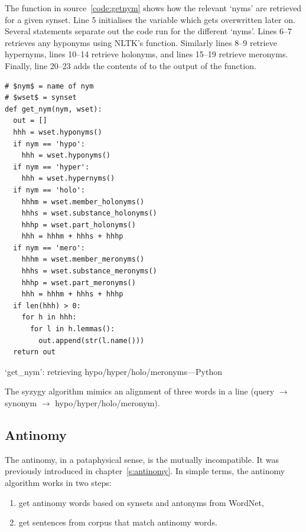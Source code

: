 The  function in source~\ref{code:getnym} shows how the relevant `nyms' are retrieved for a given synset. Line 5 initialises the variable  which gets overwritten later on. Several  statements separate out the code run for the different `nyms'. Lines 6--7 retrieves any hyponyms using \ac{NLTK}'s  function. Similarly lines 8--9 retrieve hypernyms, lines 10--14 retrieve holonyms, and lines 15--19 retrieve meronyms. Finally, line 20--23 adds the contents of  to the output of the function.

\begin{listing}[!htbp] %
  \begin{verbatim}
# $nym$ = name of nym
# $wset$ = synset
def get_nym(nym, wset):
  out = []
  hhh = wset.hyponyms()
  if nym == 'hypo':
    hhh = wset.hyponyms()
  if nym == 'hyper':
    hhh = wset.hypernyms()
  if nym == 'holo':
    hhhm = wset.member_holonyms()
    hhhs = wset.substance_holonyms()
    hhhp = wset.part_holonyms()
    hhh = hhhm + hhhs + hhhp
  if nym == 'mero':
    hhhm = wset.member_meronyms()
    hhhs = wset.substance_meronyms()
    hhhp = wset.part_meronyms()
    hhh = hhhm + hhhs + hhhp
  if len(hhh) > 0:
    for h in hhh:
      for l in h.lemmas():
        out.append(str(l.name()))
  return out
  \end{verbatim}
\caption[`get\_nym' function---Python]{`get\_nym': retrieving hypo/hyper/holo/meronyms---Python}
\label{code:getnym}
\end{listing}

The syzygy algorithm mimics an alignment of three words in a line (query $\to$ synonym $\to$ hypo/hyper/holo/meronym).


\subsection{Antinomy}
\label{s:antinomyalgo}

The antinomy, in a pataphysical sense, is the mutually incompatible. It was previously introduced in chapter~\ref{s:antinomy}. In simple terms, the antinomy algorithm works in two steps:

\begin{enumerate}
  \item get antinomy words based on synsets and antonyms from WordNet,
  \item get sentences from corpus that match antinomy words.
\end{enumerate}

